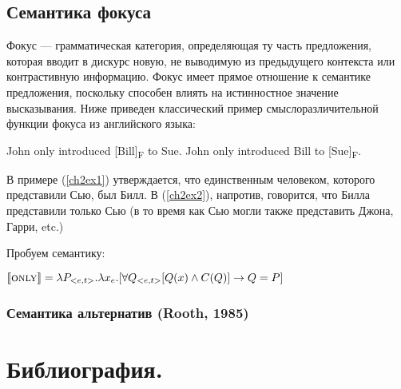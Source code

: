 \documentclass[a4paper, titlepage, 12pt]{article}
\begin{document}
\subsection[Семантика фокуса]{Семантика фокуса}

Фокус --- грамматическая категория, определяющая ту часть предложения, которая вводит в дискурс новую, не выводимую из предыдущего контекста или контрастивную информацию. Фокус имеет прямое отношение к семантике предложения, поскольку способен влиять на истинностное значение высказывания. Ниже приведен классический пример смыслоразличительной функции фокуса из английского языка:

\begin{exe}
    \ex \begin{xlist}
        \ex \label{ch2ex1} John only introduced [Bill]\textsubscript{F} to Sue.
        \ex \label{ch2ex2} John only introduced Bill to [Sue]\textsubscript{F}.
    \end{xlist}
\end{exe}

В примере (\ref{ch2ex1}) утверждается, что единственным человеком, которого представили Сью, был Билл. В (\ref{ch2ex2}), напротив, говорится, что Билла представили только Сью (в то время как Сью могли также представить Джона, Гарри, etc.)

\medskip

Пробуем семантику:

\begin{exe}
    \ex $ \llbracket \textsc{only} \rrbracket = \lambda P_{<e,t>}.\lambda x_{e}.[ \forall Q_{<e,t>} [Q(x) \land C(Q)] \rightarrow Q = P ]$
\end{exe}

\subsubsection[Семантика альтернатив (Rooth, 1985)]{Семантика альтернатив (Rooth, 1985)}



\newpage
\section{Библиография.}
\end{document}
